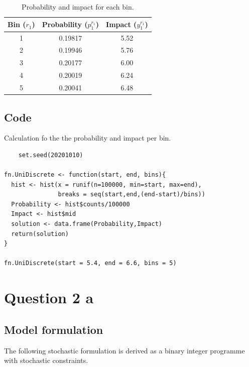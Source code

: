 \documentclass[a4paper,11pt]{article}
\begin{document}
\begin{table}[]
\caption{Probability and impact for each bin.}
\vspace{12pt}
\centering
\begin{tabular}{ccc}
\hline
\textbf{Bin ($r_1$)} & \textbf{Probability ($p_1^{r_1}$)} & \textbf{Impact ($y_1^{r_1}$)} \\
\hline
1           & 0.19817              & 5.52            \\
2           & 0.19946              & 5.76            \\
3           & 0.20177              & 6.00            \\
4           & 0.20019              & 6.24            \\
5           & 0.20041              & 6.48            \\        
\hline
\end{tabular}

\label{tab:q1cT1}
\end{table}


\subsection{Code}
Calculation fo the the probability and impact per bin.
\begin{verbatim}
	set.seed(20201010)

fn.UniDiscrete <- function(start, end, bins){
  hist <- hist(x = runif(n=100000, min=start, max=end),
               breaks = seq(start,end,(end-start)/bins))
  Probability <- hist$counts/100000
  Impact <- hist$mid
  solution <- data.frame(Probability,Impact)
  return(solution)
}

fn.UniDiscrete(start = 5.4, end = 6.6, bins = 5)
\end{verbatim}\label{code:q1c}

\newpage

\section{Question 2 a}

\subsection{Model formulation}
The following stochastic formulation is derived as a binary integer programme with stochastic constraints. 

\vspace{12pt}
\end{document}
